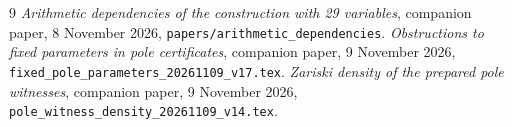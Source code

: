 \documentclass[11pt,a4paper]{article}
\begin{document}
\begin{thebibliography}{9}
\emph{Arithmetic dependencies of the construction with 29 variables},
companion paper, 8 November 2026,
\nolinkurl{papers/arithmetic_dependencies}.
\emph{Obstructions to fixed parameters in pole certificates},
companion paper, 9 November 2026,
\nolinkurl{fixed_pole_parameters_20261109_v17.tex}.
\emph{Zariski density of the prepared pole witnesses},
companion paper, 9 November 2026,
\nolinkurl{pole_witness_density_20261109_v14.tex}.
\end{thebibliography}
\end{document}
